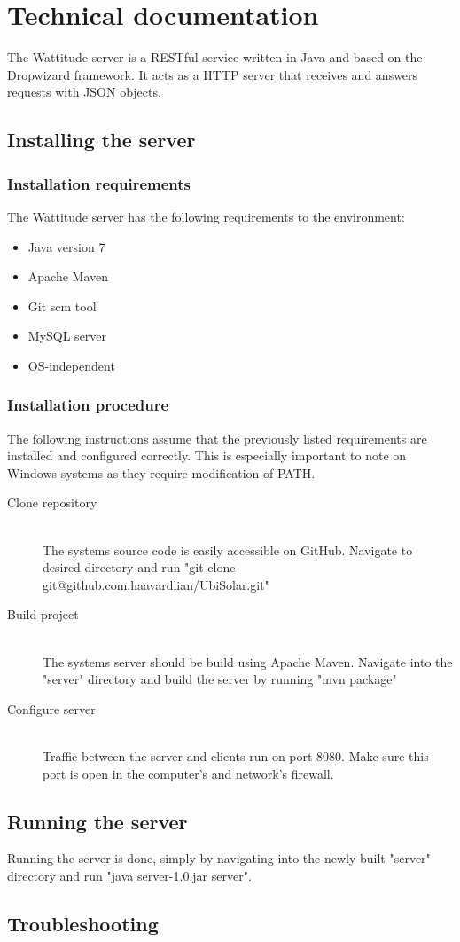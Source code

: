 \chapter{Technical documentation}
The Wattitude server is a RESTful service written in Java and based on the Dropwizard framework. It acts as a HTTP server that receives and answers requests with JSON objects. 
\section{Installing the server}
\subsection{Installation requirements}
The Wattitude server has the following requirements to the environment:
\begin{itemize}
\item Java version 7
\item Apache Maven 
\item Git scm tool
\item MySQL server
\item OS-independent
\end{itemize}
\subsection{Installation procedure}
The following instructions assume that the previously listed requirements are installed and configured correctly. This is especially important to note on Windows systems as they require modification of PATH.
\begin{description}
  \item[Clone repository] \hfill \\
  The systems source code is easily accessible on GitHub. Navigate to desired directory and run "git clone git@github.com:haavardlian/UbiSolar.git"
  \item[Build project] \hfill \\
  The systems server should be build using Apache Maven. Navigate into the "server" directory and build the server by running "mvn package"
  \item[Configure server] \hfill \\
  Traffic between the server and clients run on port 8080. Make sure this port is open in the computer's and network's firewall. 
  
\end{description}

\section{Running the server}
Running the server is done, simply by navigating into the newly built "server" directory and run "java server-1.0.jar server".

\section{Troubleshooting}